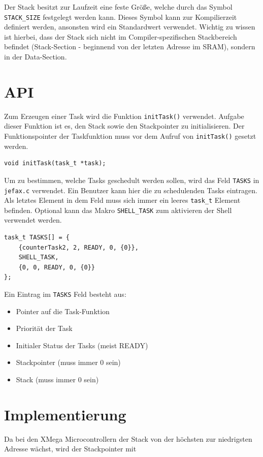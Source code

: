 \documentclass[fontsize=12pt, toc=bibliography, notitlepage]{scrreprt}
\begin{document}
Der Stack besitzt zur Laufzeit eine feste Größe, welche durch das Symbol \lstinline$STACK_SIZE$ festgelegt werden kann. Dieses Symbol kann zur Kompilierzeit definiert werden, ansonsten wird ein Standardwert verwendet. Wichtig zu wissen ist hierbei, dass der Stack sich nicht im Compiler-spezifischen Stackbereich befindet (Stack-Section - beginnend von der letzten Adresse im SRAM), sondern in der Data-Section.

\section{API}
\label{subsec:tasks-api}
Zum Erzeugen einer Task wird die Funktion \lstinline$initTask()$ verwendet. Aufgabe dieser Funktion ist es, den Stack sowie den Stackpointer zu initialisieren. Der Funktionspointer der Taskfunktion muss vor dem Aufruf von \lstinline$initTask()$ gesetzt werden.

\begin{lstlisting}
void initTask(task_t *task);
\end{lstlisting}

Um zu bestimmen, welche Tasks geschedult werden sollen, wird das Feld \lstinline$TASKS$ in \lstinline$jefax.c$ verwendet. Ein Benutzer kann hier die zu schedulenden Tasks eintragen. Als letztes Element in dem Feld muss sich immer ein leeres \lstinline$task_t$ Element befinden. Optional kann das Makro \lstinline$SHELL_TASK$ zum aktivieren der Shell verwendet werden.

\begin{lstlisting}[title=jefax.c]
task_t TASKS[] = {
    {counterTask2, 2, READY, 0, {0}},
    SHELL_TASK,
    {0, 0, READY, 0, {0}}
};
\end{lstlisting}

Ein Eintrag im \lstinline$TASKS$ Feld besteht aus:

\begin{itemize}
\item Pointer auf die Task-Funktion
\item Priorität der Task
\item Initialer Status der Tasks (meist READY)
\item Stackpointer (muss immer 0 sein)
\item Stack (muss immer {0} sein)
\end{itemize}

\section{Implementierung}
\label{subsec:tasks-impl}
Da bei den XMega Microcontrollern der Stack von der höchsten zur niedrigsten Adresse wächst, wird der Stackpointer mit
\end{document}
